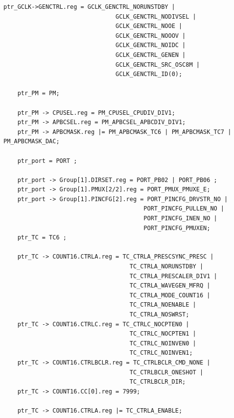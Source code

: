 \documentclass[a4paper]{article}
\begin{document}
\begin{lstlisting}[style=CStyle]
ptr_GCLK->GENCTRL.reg = GCLK_GENCTRL_NORUNSTDBY |
								GCLK_GENCTRL_NODIVSEL |
								GCLK_GENCTRL_NOOE |
								GCLK_GENCTRL_NOOOV |
								GCLK_GENCTRL_NOIDC |
								GCLK_GENCTRL_GENEN |
								GCLK_GENCTRL_SRC_OSC8M |
								GCLK_GENCTRL_ID(0);
									
	ptr_PM = PM;
	
	ptr_PM -> CPUSEL.reg = PM_CPUSEL_CPUDIV_DIV1;
	ptr_PM -> APBCSEL.reg = PM_APBCSEL_APBCDIV_DIV1;
	ptr_PM -> APBCMASK.reg |= PM_APBCMASK_TC6 | PM_APBCMASK_TC7 | PM_APBCMASK_DAC;
	
	ptr_port = PORT ;
	
	ptr_port -> Group[1].DIRSET.reg = PORT_PB02 | PORT_PB06 ; 
	ptr_port -> Group[1].PMUX[2/2].reg = PORT_PMUX_PMUXE_E;
	ptr_port -> Group[1].PINCFG[2].reg = PORT_PINCFG_DRVSTR_NO |
										PORT_PINCFG_PULLEN_NO |
										PORT_PINCFG_INEN_NO |
										PORT_PINCFG_PMUXEN;
	ptr_TC = TC6 ;
	
	ptr_TC -> COUNT16.CTRLA.reg = TC_CTRLA_PRESCSYNC_PRESC |
									TC_CTRLA_NORUNSTDBY |
									TC_CTRLA_PRESCALER_DIV1 |
									TC_CTRLA_WAVEGEN_MFRQ |
									TC_CTRLA_MODE_COUNT16 |
									TC_CTRLA_NOENABLE |
									TC_CTRLA_NOSWRST;
	ptr_TC -> COUNT16.CTRLC.reg = TC_CTRLC_NOCPTEN0 |
									TC_CTRLC_NOCPTEN1 |
									TC_CTRLC_NOINVEN0 |
									TC_CTRLC_NOINVEN1;
	ptr_TC -> COUNT16.CTRLBCLR.reg = TC_CTRLBCLR_CMD_NONE |
									TC_CTRLBCLR_ONESHOT |
									TC_CTRLBCLR_DIR;
	ptr_TC -> COUNT16.CC[0].reg = 7999;
	
	ptr_TC -> COUNT16.CTRLA.reg |= TC_CTRLA_ENABLE;	
	\end{lstlisting}
\end{document}
